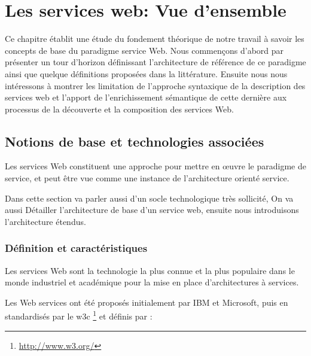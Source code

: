 

\chapter{Les services web: Vue d'ensemble}

Ce chapitre établit une étude du fondement théorique de notre travail à savoir les concepts de base 
du paradigme service Web.  Nous commençons d'abord par présenter un tour d'horizon définissant l'architecture
de référence de ce paradigme ainsi que quelque définitions proposées dans la littérature. Ensuite nous nous
intéressons à montrer les limitation de l'approche syntaxique de la description des services web et 
l'apport de l'enrichissement sémantique de cette dernière aux processus de la découverte et la composition 
des services Web.\\
\newpage

  \section{Notions de base et technologies associées} 

  Les services Web constituent une approche pour mettre en œuvre le paradigme de service,
  et peut être vue comme une instance de l'architecture orienté service.

  Dans cette section va parler aussi d'un socle technologique très sollicité, On va aussi Détailler 
  l'architecture de base d'un service web, ensuite nous introduisons l'architecture étendus.


    \subsection{Définition et caractéristiques }
    Les services Web sont la technologie la plus connue et la plus populaire dans le monde 
    industriel et académique pour la mise en place d’architectures à services.

    Les Web services ont été proposés initialement par IBM \cite{kreger2001web} et Microsoft, puis en
    standardisés par le \acrshort{w3c} \footnote{\url{http://www.w3.org/}} et définis \cite{WSA} par :\\


